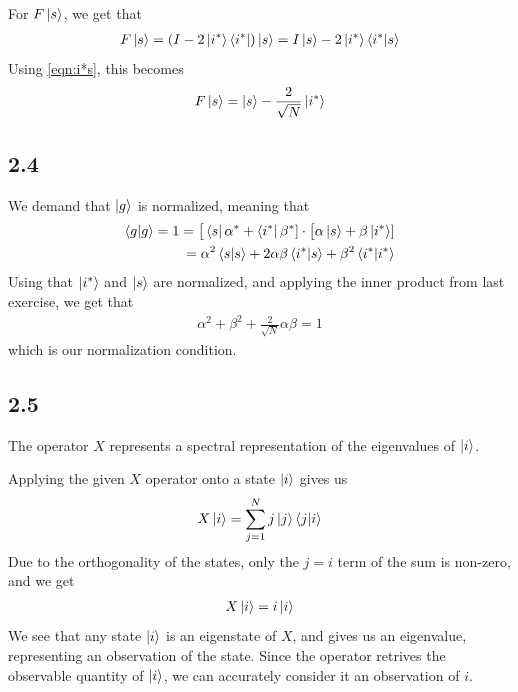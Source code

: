 \documentclass[12p,a4paper]{article}
\newcommand{\0}{\ket{0}}
\newcommand{\1}{\ket{1}}
\begin{document}
For $F\ket{s}$, we get that
\begin{align*}
    F\ket{s} = (I - 2\ket{i^*}\bra{i^*})\ket{s} = I\ket{s} - 2 \ket{i^*}\bra{i^*}\ket{s}
\end{align*}
Using \ref{eqn:i*s}, this becomes
\begin{align*}
    F\ket{s} = \ket{s} - \frac{2}{\sqrt{N}}\ket{i^*}
\end{align*}



\subsection*{2.4}
We demand that $\ket{g}$ is normalized, meaning that
\begin{align*}
    \bra{g}\ket{g} = 1 = \big[\bra{s}\alpha^* + \bra{i^*}\beta^*] \cdot \big[\alpha\ket{s} + \beta\ket{i^*}] \\
    = \alpha^2 \bra{s}\ket{s} + 2\alpha\beta\bra{i^*}\ket{s} + \beta^2\bra{i^*}\ket{i^*}
\end{align*}
Using that $\ket{i^*}$ and $\ket{s}$ are normalized, and applying the inner product from last exercise, we get that
\begin{align*}
    \alpha^2 + \beta^2 + \frac{2}{\sqrt{N}}\alpha\beta = 1
\end{align*}
which is our normalization condition.



\subsection*{2.5}
The operator $X$ represents a spectral representation of the eigenvalues of $\ket{i}$.

Applying the given $X$ operator onto a state $\ket{i}$ gives us
\begin{align*}
    X\ket{i} = \sum\limits_{j=1}^N j\ket{j}\bra{j}\ket{i}
\end{align*}
Due to the orthogonality of the states, only the $j=i$ term of the sum is non-zero, and we get
\begin{align*}
    X\ket{i} = i\ket{i}
\end{align*}
We see that any state $\ket{i}$ is an eigenstate of $X$, and gives us an eigenvalue, representing an observation of the state. Since the operator retrives the observable quantity of $\ket{i}$, we can accurately consider it an observation of $i$.
\end{document}
